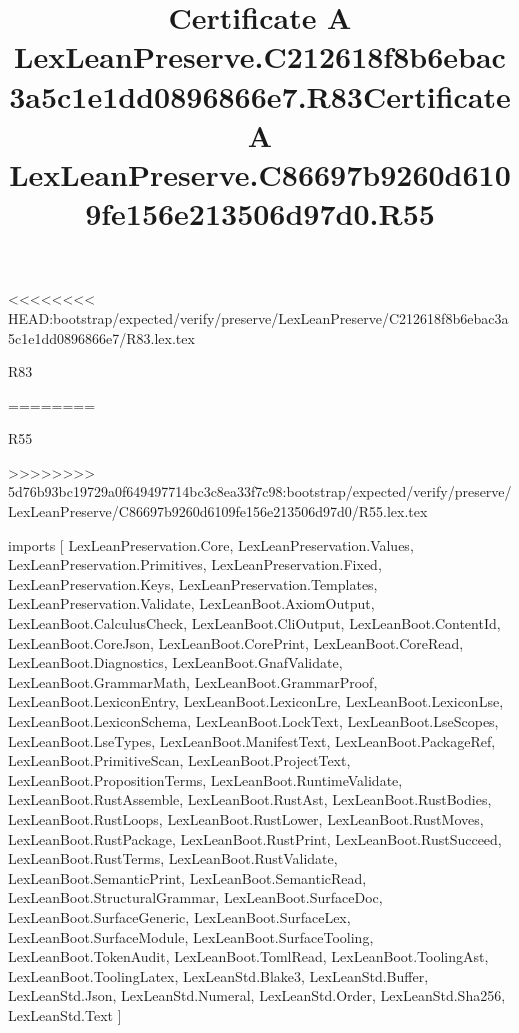 <<<<<<<< HEAD:bootstrap/expected/verify/preserve/LexLeanPreserve/C212618f8b6ebac3a5c1e1dd0896866e7/R83.lex.tex
\begin{lexlean}{R83}
\title{Certificate A LexLeanPreserve.C212618f8b6ebac3a5c1e1dd0896866e7.R83}
========
\begin{lexlean}{R55}
\title{Certificate A LexLeanPreserve.C86697b9260d6109fe156e213506d97d0.R55}
>>>>>>>> 5d76b93bc19729a0f649497714bc3c8ea33f7c98:bootstrap/expected/verify/preserve/LexLeanPreserve/C86697b9260d6109fe156e213506d97d0/R55.lex.tex
\begin{coremodule}
imports [
  LexLeanPreservation.Core,
  LexLeanPreservation.Values,
  LexLeanPreservation.Primitives,
  LexLeanPreservation.Fixed,
  LexLeanPreservation.Keys,
  LexLeanPreservation.Templates,
  LexLeanPreservation.Validate,
  LexLeanBoot.AxiomOutput,
  LexLeanBoot.CalculusCheck,
  LexLeanBoot.CliOutput,
  LexLeanBoot.ContentId,
  LexLeanBoot.CoreJson,
  LexLeanBoot.CorePrint,
  LexLeanBoot.CoreRead,
  LexLeanBoot.Diagnostics,
  LexLeanBoot.GnafValidate,
  LexLeanBoot.GrammarMath,
  LexLeanBoot.GrammarProof,
  LexLeanBoot.LexiconEntry,
  LexLeanBoot.LexiconLre,
  LexLeanBoot.LexiconLse,
  LexLeanBoot.LexiconSchema,
  LexLeanBoot.LockText,
  LexLeanBoot.LseScopes,
  LexLeanBoot.LseTypes,
  LexLeanBoot.ManifestText,
  LexLeanBoot.PackageRef,
  LexLeanBoot.PrimitiveScan,
  LexLeanBoot.ProjectText,
  LexLeanBoot.PropositionTerms,
  LexLeanBoot.RuntimeValidate,
  LexLeanBoot.RustAssemble,
  LexLeanBoot.RustAst,
  LexLeanBoot.RustBodies,
  LexLeanBoot.RustLoops,
  LexLeanBoot.RustLower,
  LexLeanBoot.RustMoves,
  LexLeanBoot.RustPackage,
  LexLeanBoot.RustPrint,
  LexLeanBoot.RustSucceed,
  LexLeanBoot.RustTerms,
  LexLeanBoot.RustValidate,
  LexLeanBoot.SemanticPrint,
  LexLeanBoot.SemanticRead,
  LexLeanBoot.StructuralGrammar,
  LexLeanBoot.SurfaceDoc,
  LexLeanBoot.SurfaceGeneric,
  LexLeanBoot.SurfaceLex,
  LexLeanBoot.SurfaceModule,
  LexLeanBoot.SurfaceTooling,
  LexLeanBoot.TokenAudit,
  LexLeanBoot.TomlRead,
  LexLeanBoot.ToolingAst,
  LexLeanBoot.ToolingLatex,
  LexLeanStd.Blake3,
  LexLeanStd.Buffer,
  LexLeanStd.Json,
  LexLeanStd.Numeral,
  LexLeanStd.Order,
  LexLeanStd.Sha256,
  LexLeanStd.Text
]


\end{coremodule}
\end{lexlean}
\end{lexlean}

